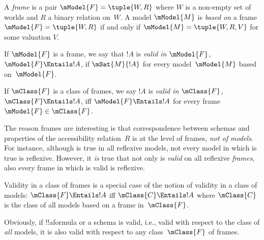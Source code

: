 \documentclass[../../../include/open-logic-section]{subfiles}
\begin{document}

\begin{defn}
  A \emph{frame} is a pair $\mModel{F} = \tuple{W,R}$ where $W$ is a
  non-empty set of worlds and $R$ a binary relation on~$W$. A model
  $\mModel{M}$ is \emph{based on} a frame $\mModel{F} = \tuple{W,R}$
  if and only if $\mModel{M} = \tuple{W, R, V}$ for some valuation $V$.
\end{defn}

\begin{defn}
  If $\mModel{F}$ is a frame, we say that $!A$ is \emph{valid in
    $\mModel{F}$,} $\mModel{F} \Entails !A$, if $\mSat{M}{!A}$ for
  every model~$\mModel{M}$ based on~$\mModel{F}$.
  
  If $\mClass{F}$ is a class of frames, we say $!A$ is \emph{valid in
    $\mClass{F}$,} $\mClass{F} \Entails !A$, iff $\mModel{F} \Entails
  !A$ for every frame~$\mModel{F} \in \mClass{F}$.
\end{defn}

The reason frames are interesting is that correspondence between
schemas and properties of the accessibility relation~$R$ is at the
level of frames, \emph{not of models}. For instance, although 
is true in all reflexive models, not every model in which  is
true is reflexive. However, it \emph{is} true that not only is 
\emph{valid} on all reflexive \emph{frames}, also every frame in
which  is valid is reflexive.

\begin{rem}
Validity in a class of frames is a special case of the notion of
validity in a class of models: $\mClass{F} \Entails !A$ iff
$\mClass{C} \Entails !A$ where $\mClass{C}$ is the class of all models
based on a frame in~$\mClass{F}$.

Obviously, if !!a{formula} or a schema is valid, i.e., valid with
respect to the class of \emph{all} models, it is also valid with
respect to any class~$\mClass{F}$ of frames.
\end{rem}
\end{document}

